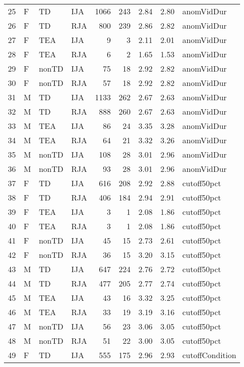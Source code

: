 \documentclass{article}
\begin{document}
\begin{table}[ht]
\begin{tabular}{rlllrrrrl}
  25 & F & TD & IJA & 1066 & 243 & 2.84 & 2.80 & anomVidDur \\ 
  26 & F & TD & RJA & 800 & 239 & 2.86 & 2.82 & anomVidDur \\ 
  27 & F & TEA & IJA &   9 &   3 & 2.11 & 2.01 & anomVidDur \\ 
  28 & F & TEA & RJA &   6 &   2 & 1.65 & 1.53 & anomVidDur \\ 
  29 & F & nonTD & IJA &  75 &  18 & 2.92 & 2.82 & anomVidDur \\ 
  30 & F & nonTD & RJA &  57 &  18 & 2.92 & 2.82 & anomVidDur \\ 
  31 & M & TD & IJA & 1133 & 262 & 2.67 & 2.63 & anomVidDur \\ 
  32 & M & TD & RJA & 888 & 260 & 2.67 & 2.63 & anomVidDur \\ 
  33 & M & TEA & IJA &  86 &  24 & 3.35 & 3.28 & anomVidDur \\ 
  34 & M & TEA & RJA &  64 &  21 & 3.32 & 3.26 & anomVidDur \\ 
  35 & M & nonTD & IJA & 108 &  28 & 3.01 & 2.96 & anomVidDur \\ 
  36 & M & nonTD & RJA &  93 &  28 & 3.01 & 2.96 & anomVidDur \\ 
  37 & F & TD & IJA & 616 & 208 & 2.92 & 2.88 & cutoff50pct \\ 
  38 & F & TD & RJA & 406 & 184 & 2.94 & 2.91 & cutoff50pct \\ 
  39 & F & TEA & IJA &   3 &   1 & 2.08 & 1.86 & cutoff50pct \\ 
  40 & F & TEA & RJA &   3 &   1 & 2.08 & 1.86 & cutoff50pct \\ 
  41 & F & nonTD & IJA &  45 &  15 & 2.73 & 2.61 & cutoff50pct \\ 
  42 & F & nonTD & RJA &  36 &  15 & 3.20 & 3.15 & cutoff50pct \\ 
  43 & M & TD & IJA & 647 & 224 & 2.76 & 2.72 & cutoff50pct \\ 
  44 & M & TD & RJA & 477 & 205 & 2.77 & 2.74 & cutoff50pct \\ 
  45 & M & TEA & IJA &  43 &  16 & 3.32 & 3.25 & cutoff50pct \\ 
  46 & M & TEA & RJA &  33 &  19 & 3.19 & 3.16 & cutoff50pct \\ 
  47 & M & nonTD & IJA &  56 &  23 & 3.06 & 3.05 & cutoff50pct \\ 
  48 & M & nonTD & RJA &  51 &  22 & 3.00 & 3.05 & cutoff50pct \\ 
  49 & F & TD & IJA & 555 & 175 & 2.96 & 2.93 & cutoffCondition \\ 

\end{tabular}
\end{table}
\end{document}
